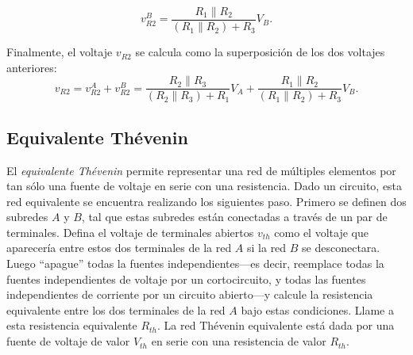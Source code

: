 \documentclass[paper=letter, fontsize=11pt]{scrartcl}
\begin{document}
\begin{ex}
\begin{enumerate}[label=\roman*]
  \begin{equation*}
    v^B_{R2} = \frac{R_1 \parallel R_2}{ (R_1 \parallel R_2) + R_3} V_B.
  \end{equation*}
  \end{enumerate}

Finalmente, el voltaje $v_{R2}$ se calcula como la superposición de los dos
voltajes anteriores:
%
\begin{equation*}
  v_{R2} = v^A_{R2} + v^B_{R2} = \frac{R_2 \parallel R_3}{ (R_2 \parallel R_3)
    + R_1} V_A + \frac{R_1 \parallel R_2}{ (R_1 \parallel R_2) + R_3} V_B.
\end{equation*}
\end{ex}


\subsection{Equivalente Thévenin}

El \emph{equivalente Thévenin} permite representar una red de múltiples
elementos por tan sólo una fuente de voltaje en serie con una resistencia. Dado
un circuito, esta red equivalente se encuentra realizando los siguientes
paso. Primero se definen dos subredes $A$ y $B$, tal que estas subredes están
conectadas a través de un par de terminales. Defina el voltaje de terminales
abiertos $v_{th}$ como el voltaje que aparecería entre estos dos terminales de
la red $A$ si la red $B$ se desconectara. Luego ``apague'' todas la fuentes
independientes---es decir, reemplace todas la fuentes independientes de voltaje
por un cortocircuito, y todas las fuentes independientes de corriente por un
circuito abierto---y calcule la resistencia equivalente entre los dos
terminales de la red $A$ bajo estas condiciones. Llame a esta resistencia
equivalente $R_{th}$. La red Thévenin equivalente está dada por una fuente de
voltaje de valor $V_{th}$ en serie con una resistencia de valor $R_{th}$.
\end{document}
